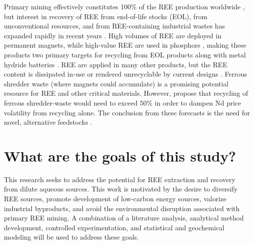 Primary mining effectively constitutes 100\% of the REE production worldwide \citep{Binnemans_JCP_2013, USGS_commsumm},
but interest in recovery of REE from end-of-life stocks (EOL), from unconventional resources, and from REE-containing industrial wastes has expanded rapidly in recent years \citep{Binnemans_JCP_2015}.
High volumes of REE are deployed in permanent magnets, while high-value REE are used in phosphors \citep{Hatch_Elem_2012},
making these products two primary targets for recycling from EOL products along with metal hydride batteries \citep{Binnemans_JCP_2013,Tunsu_Hydro_2015}.
REE are applied in many other products, but the REE content is dissipated in-use or rendered unrecyclable by current designs \citep{Ciacci_EST_2015}.
Ferrous shredder waste (where magnets could accumulate) is a promising potential resource for REE and other critical materials.
However, \citet{Bandara_JSM_2015} propose that recycling of ferrous shredder-waste would need to exceed 50\% in order to dampen Nd price volatility from recycling alone. The conclusion from these forecasts is the need for novel, alternative feedstocks \citep{Bandara_JSM_2015}.

\section{What are the goals of this study?}
This research seeks to address the potential for REE extraction and recovery from dilute aqueous sources.
This work is motivated by the desire to diversify REE sources, promote development of low-carbon energy sources, valorize industrial byproducts, and avoid the environmental disruption associated with primary REE mining.
A combination of a literature analysis, analytical method development, controlled experimentation, and statistical and geochemical modeling will be used to address these goals.

